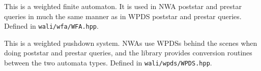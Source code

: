 \begin{functionlist}
   This is a weighted finite automaton. It is
    used in NWA poststar and prestar queries in much the same manner as in
    WPDS poststar and prestar queries. Defined in \texttt{wali/wfa/WFA.hpp}.

   This is a weighted pushdown system. NWAs use
    WPDSs behind the scenes when doing poststar and prestar queries, and the
    library provides conversion routines between the two automata
    types. Defined in \texttt{wali/wpds/WPDS.hpp}.
\end{functionlist}



